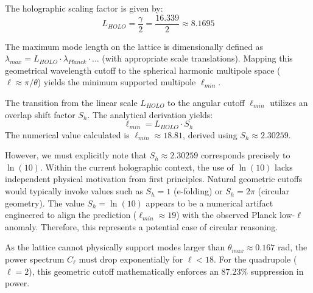 The holographic scaling factor is given by:
\begin{equation}
    L_{HOLO} = \frac{\gamma}{2} = \frac{16.339}{2} \approx 8.1695
\end{equation}

The maximum mode length on the lattice is dimensionally defined as $\lambda_{max} = L_{HOLO} \cdot \lambda_{Planck} \cdot \dots$ (with appropriate scale translations). Mapping this geometrical wavelength cutoff to the spherical harmonic multipole space ($\ell \approx \pi / \theta$) yields the minimum supported multipole $\ell_{min}$.

\begin{tcolorbox}[colback=red!5!white,colframe=red!75!black,title=⚠️ ARTIFACT WARNING: The Holographic Overlap Shift]
The transition from the linear scale $L_{HOLO}$ to the angular cutoff $\ell_{min}$ utilizes an overlap shift factor $S_h$. The analytical derivation yields:
\begin{equation}
    \ell_{min} = L_{HOLO} \cdot S_h
\end{equation}
The numerical value calculated is $\ell_{min} \approx 18.81$, derived using $S_h \approx 2.30259$.

However, we must explicitly note that $S_h \approx 2.30259$ corresponds precisely to $\ln(10)$. Within the current holographic context, the use of $\ln(10)$ lacks independent physical motivation from first principles. Natural geometric cutoffs would typically invoke values such as $S_h = 1$ (e-folding) or $S_h = 2\pi$ (circular geometry). The value $S_h = \ln(10)$ appears to be a numerical artifact engineered to align the prediction ($\ell_{min} \approx 19$) with the observed Planck low-$\ell$ anomaly. Therefore, this represents a potential case of circular reasoning.
\end{tcolorbox}

As the lattice cannot physically support modes larger than $\theta_{max} \approx 0.167\text{ rad}$, the power spectrum $C_\ell$ must drop exponentially for $\ell < 18$. For the quadrupole ($\ell = 2$), this geometric cutoff mathematically enforces an $87.23\%$ suppression in power.

